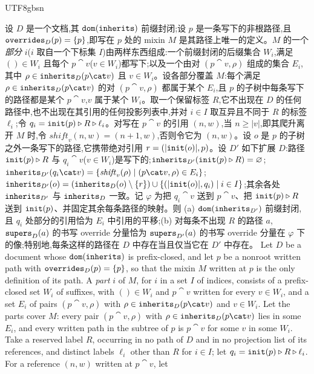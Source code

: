 \begin{CJK*}{UTF8}{gbsn}
\begin{theorem}
  设 $D$ 是一个文档,其 $\mathtt{dom}(\mathtt{inherits})$ 前缀封闭;设 $p$ 是一条写下的非根路径,且 $\mathtt{overrides}_D(p) = \{p\}$,即写在 $p$ 处的 mixin $M$ 是其路径上唯一的定义。$M$ 的一个\emph{部分} $i$($i$ 取自一个下标集 $I$)由两样东西组成:一个前缀封闭的后缀集合 $W_i$,满足 $() \in W_i$ 且每个 $p \cat v$($v \in W_i$)都写下;以及一个由对 $(p \cat v, \rho)$ 组成的集合 $E_i$,其中 $\rho \in \inherits_D(p \cat v)$ 且 $v \in W_i$。设各部分覆盖 $M$:每个满足 $\rho \in \inherits_D(p \cat v)$ 的对 $(p \cat v, \rho)$ 都属于某个 $E_i$,且 $p$ 的子树中每条写下的路径都是某个 $p \cat v$,$v$ 属于某个 $W_i$。取一个保留标签 $R$,它不出现在 $D$ 的任何路径中,也不出现在其引用的任何投影列表中,并对 $i \in I$ 取互异且不同于 $R$ 的标签 $\ell_i$;令 $q_i = \mathtt{init}(p) \mathbin{\triangleright} R \mathbin{\triangleright} \ell_i$。对写在 $p \cat v$ 的引用 $(n, w)$,当 $n \ge |v|$,即其爬升离开 $M$ 时,令 $\mathit{shift}_v(n, w) = (n + 1, w)$,否则令它为 $(n, w)$。设 $o$ 是 $p$ 的子树之外一条写下的路径,它携带绝对引用 $r = (|\mathtt{init}(o)|, p)$。设 $D'$ 如下扩展 $D$:路径 $\mathtt{init}(p) \mathbin{\triangleright} R$ 与 $q_i \cat v$($v \in W_i$)是写下的;$\mathtt{inherits}_{D'}(\mathtt{init}(p) \mathbin{\triangleright} R) = \varnothing$;$\inherits_{D'}(q_i \cat v) = \{\mathit{shift}_v(\rho) \mid (p \cat v, \rho) \in E_i\}$;$\mathtt{inherits}_{D'}(o) = (\mathtt{inherits}_D(o) \setminus \{r\}) \cup \{(|\mathtt{init}(o)|, q_i) \mid i \in I\}$;其余各处 $\mathtt{inherits}_{D'}$ 与 $\mathtt{inherits}_D$ 一致。记 $\varphi$ 为把 $q_i \cat v$ 送到 $p \cat v$、把 $\mathtt{init}(p) \mathbin{\triangleright} R$ 送到 $\mathtt{init}(p)$、并固定其余每条路径的映射。则 (a) $\mathtt{dom}(\mathtt{inherits}_{D'})$ 前缀封闭,且 $q_i$ 处部分的引用恰为 $E_i$ 中引用的平移;(b) 对每条不出现 $R$ 的路径 $a$,$\mathtt{supers}_D(a)$ 的书写 override 分量恰为 $\mathtt{supers}_{D'}(a)$ 的书写 override 分量在 $\varphi$ 下的像;特别地,每条这样的路径在 $D$ 中存在当且仅当它在 $D'$ 中存在。
  \else
  Let $D$ be a document whose $\mathtt{dom}(\mathtt{inherits})$ is prefix-closed, and let $p$ be a nonroot written path
  with $\mathtt{overrides}_D(p) = \{p\}$, so that the mixin $M$ written at $p$ is the only definition of its
  path. A \emph{part} $i$ of $M$, for $i$ in a set $I$ of indices, consists of a prefix-closed set
  $W_i$ of suffixes, with $() \in W_i$ and $p \cat v$ written for every $v \in W_i$, and a set $E_i$
  of pairs $(p \cat v, \rho)$ with $\rho \in \inherits_D(p \cat v)$ and $v \in W_i$. Let the parts
  cover $M$: every pair $(p \cat v, \rho)$ with $\rho \in \inherits_D(p \cat v)$ lies in some $E_i$,
  and every written path in the subtree of $p$ is $p \cat v$ for some $v$ in some $W_i$. Take a
  reserved label $R$, occurring in no path of $D$ and in no projection list of its references, and
  distinct labels $\ell_i$ other than $R$ for $i \in I$; let
  $q_i = \mathtt{init}(p) \mathbin{\triangleright} R \mathbin{\triangleright} \ell_i$. For a reference $(n, w)$ written at $p \cat v$, let

\end{theorem}
\end{CJK*}
